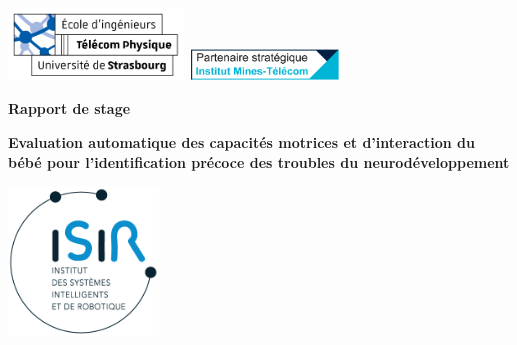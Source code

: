 \begin{titlepage}
    \begin{center}
    \includegraphics[width=0.35\textwidth]{../tps}\hspace{2 in}
    \includegraphics[width=0.3\textwidth]{../imt}
    
    \vspace{1cm}
    {\huge
   {\selectfont \textbf{Rapport de stage}}\vspace*{0.2cm}
	}
 
    \Huge
    {\selectfont\textbf{Evaluation automatique des capacités motrices et d'interaction du bébé pour l'identification précoce des troubles du neurodéveloppement}\vspace*{0.5cm}
       
        {\LARGE  
        \laboratoire}
        \vspace*{0.5cm}
        
        \includegraphics[width=0.3\textwidth]{../isir}

		{\Large   
			{\periode}\vspace*{0.1cm}
   
			{\etudiant}\vspace*{0.1cm}
   
            {\encadrant}\vspace*{0.1cm}
            
            {\parcours}\vspace*{0.1cm}
            
            {\annee}\vspace*{0.1cm}
		}
    }
    
    	\vspace{0.1in}

    \vfill
         
    
    
    \end{center}
\end{titlepage}